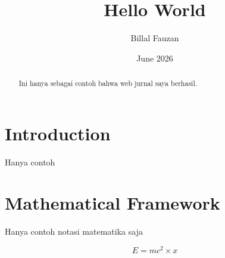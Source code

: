 \documentclass{article}
\title{Hello World}
\author{Billal Fauzan}
\date{June 2026}
\begin{document}
\maketitle

\begin{abstract}
Ini hanya sebagai contoh bahwa web jurnal saya berhasil.
\end{abstract}

\section{Introduction}
Hanya contoh

\section{Mathematical Framework}
Hanya contoh notasi matematika saja

\begin{equation}
E = mc^2 \times x
\end{equation}
\end{document}
